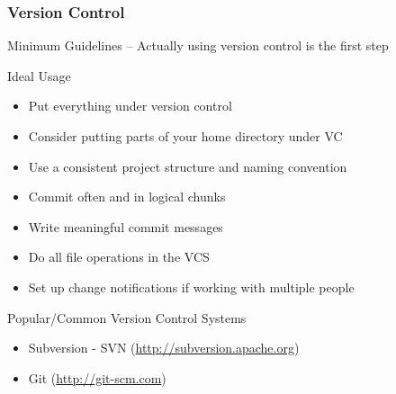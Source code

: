 \documentclass[mathserif]{beamer}
\begin{document}
%
%
%
\begin{frame}
\frametitle{Version Control}
Minimum Guidelines -- Actually using version control is the first step

\begin{block}{Ideal Usage}
\begin{itemize}
\item Put everything under version control
\item Consider putting parts of your home directory under VC
\item Use a consistent project structure and naming convention
\item Commit often and in logical chunks
\item Write meaningful commit messages
\item Do all file operations in the VCS
\item Set up change notifications if working with multiple people
\end{itemize}
\end{block}

\begin{block}{Popular/Common Version Control Systems}
\begin{itemize}
\item Subversion - SVN (\url{http://subversion.apache.org})
\item Git (\url{http://git-scm.com})
\end{itemize}
\end{block}
\end{frame}
\end{document}
